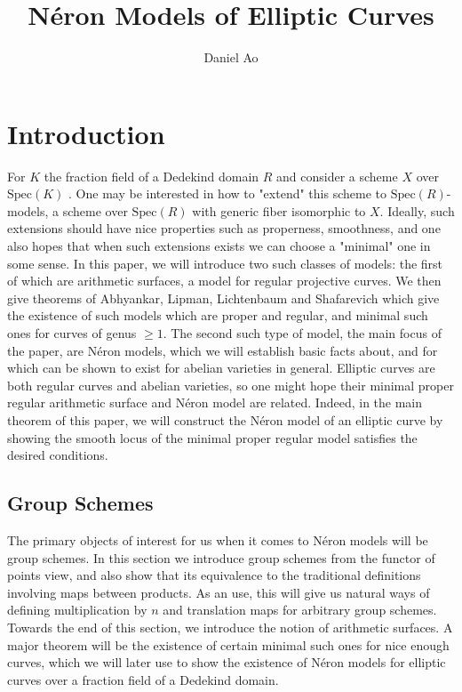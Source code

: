\documentclass{article}
\theoremstyle{definition}
\theoremstyle{remark}
\theoremstyle{plain}
\begin{document}
\title{N\'eron Models of Elliptic Curves}

\author{Daniel Ao}
\maketitle

\tableofcontents

\section{Introduction}
For $K$ the fraction field of a Dedekind domain $R$ and consider a scheme $X$ over $\text{Spec}(K)$ .
One may be interested in how to "extend" this scheme to $\text{Spec}(R)$-models, a scheme over $\text{Spec}(R)$ with generic fiber isomorphic to $X$.
Ideally, such extensions should have nice properties such as properness, smoothness, and one also hopes that when such extensions exists we can choose a "minimal" one in some sense. \newline
\indent In this paper, we will introduce two such classes of models: the first of which are arithmetic surfaces, a model for regular projective curves.
We then give theorems of Abhyankar, Lipman, Lichtenbaum and Shafarevich which give the existence of such models which are proper and regular, and minimal such ones for curves of genus $\geq 1$. \newline
\indent The second such type of model, the main focus of the paper, are N\'eron models, which we will establish basic facts about, and for which can be shown to exist for abelian varieties in general.
Elliptic curves are both regular curves and abelian varieties, so one might hope their minimal proper regular arithmetic surface and N\'eron model are related.
Indeed, in the main theorem of this paper, we will construct the N\'eron model of an elliptic curve by showing the smooth locus of the minimal proper regular model satisfies the desired conditions.


\subsection{Group Schemes}

\indent The primary objects of interest for us when it comes to N\'eron models will be group schemes.
In this section we introduce group schemes from the functor of points view, and also show that its equivalence to the traditional definitions involving maps between products.
As an use, this will give us natural ways of defining multiplication by $n$ and translation maps for arbitrary group schemes.\newline
\indent Towards the end of this section, we introduce the notion of arithmetic surfaces.
A major theorem will be the existence of certain minimal such ones for nice enough curves, which we will later use to show the existence of N\'eron models for elliptic curves over a fraction field of a Dedekind domain.
\end{document}
